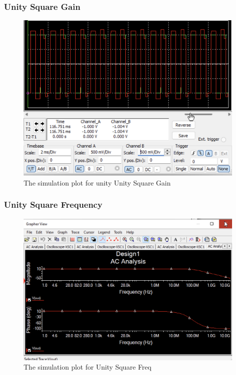\documentclass{article}
\begin{document}
	\subsubsection{Unity Square Gain}
	\begin{figure}[H]
	\centering
	\includegraphics[width=1\textwidth]{Unity/UnitySquareGain.png}
	\caption{The simulation plot for unity Unity Square Gain}
	\label{fig:UnitySquareGain}
	\end{figure}
	
	\subsubsection{Unity Square Frequency}
	\begin{figure}[H]
	\centering
	\includegraphics[width=1\textwidth]{Unity/UnitySquareFreq.png}
	\caption{The simulation plot for Unity Square Freq}
	\label{fig:UnitySquareFreq}
	\end{figure}
	
\end{document}
